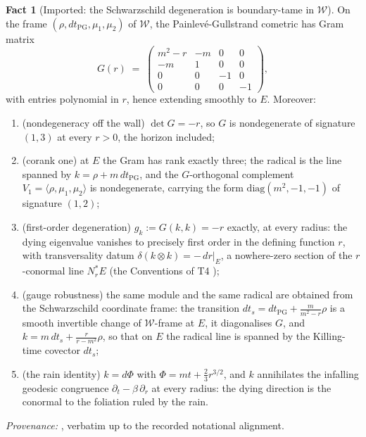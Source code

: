 \documentclass[11pt]{article}
\theoremstyle{definition}
\newtheorem{fact}[theorem]{Fact}
\newcommand{\shW}{\mathcal{W}}
\begin{document}
\begin{fact}[Imported: the Schwarzschild degeneration is boundary-tame in $\shW$]\label{fact:schwtame}
On the frame $(\rho, dt_{\mathrm{PG}}, \mu_1, \mu_2)$ of $\shW$, the Painlev\'e-Gullstrand cometric has Gram matrix
\[
G(r) \;=\;
\begin{pmatrix}
m^2 - r & -m & 0 & 0\\
-m & 1 & 0 & 0\\
0 & 0 & -1 & 0\\
0 & 0 & 0 & -1
\end{pmatrix},
\]
with entries polynomial in $r$, hence extending smoothly to $E$. Moreover:
\begin{enumerate}
\item (nondegeneracy off the wall) $\det G = -r$, so $G$ is nondegenerate of signature $(1,3)$ at every $r > 0$, the horizon included;
\item (corank one) at $E$ the Gram has rank exactly three; the radical is the line spanned by $k = \rho + m\,dt_{\mathrm{PG}}$, and the $G$-orthogonal complement $V_1 = \langle \rho, \mu_1, \mu_2\rangle$ is nondegenerate, carrying the form $\mathrm{diag}(m^2, -1, -1)$ of signature $(1,2)$;
\item (first-order degeneration) $g_k := G(k,k) = -r$ exactly, at every radius: the dying eigenvalue vanishes to precisely first order in the defining function $r$, with transversality datum $\delta(k \otimes k) = -\,dr|_E$, a nowhere-zero section of the $r$-conormal line $N^*_rE$ (the Conventions of T4 \cite{ButlerT4});
\item (gauge robustness) the same module and the same radical are obtained from the Schwarzschild coordinate frame: the transition $dt_s = dt_{\mathrm{PG}} + \tfrac{m}{m^2 - r}\rho$ is a smooth invertible change of $\shW$-frame at $E$, it diagonalises $G$, and $k = m\,dt_s + \tfrac{r}{r - m^2}\rho$, so that on $E$ the radical line is spanned by the Killing-time covector $dt_s$;
\item (the rain identity) $k = d\Phi$ with $\Phi = m t + \tfrac23 r^{3/2}$, and $k$ annihilates the infalling geodesic congruence $\partial_t - \beta\,\partial_r$ at every radius: the dying direction is the conormal to the foliation ruled by the rain.
\end{enumerate}
\emph{Provenance:} \cite[Thm.~8.7]{ButlerT4}, verbatim up to the recorded notational alignment.
\end{fact}
\end{document}

